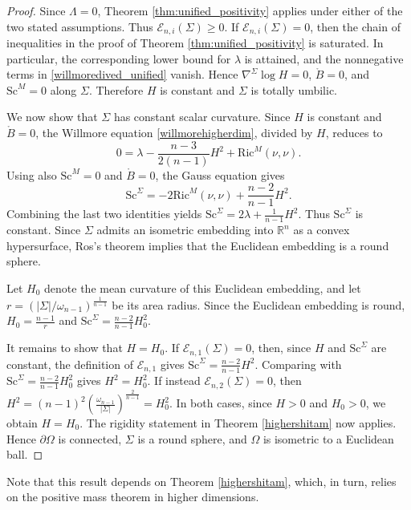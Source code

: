 \documentclass[12pt,a4paper]{amsart}
\theoremstyle{plain}
\theoremstyle{definition}
\begin{document}
\begin{proof}
Since $\Lambda=0$, Theorem \ref{thm:unified_positivity} applies under either of the two stated assumptions. Thus $\mathcal E_{n,i}(\Sigma)\ge 0$. If $\mathcal E_{n,i}(\Sigma)=0$, then the chain of inequalities in the proof of Theorem \ref{thm:unified_positivity} is saturated. In particular, the corresponding lower bound for $\lambda$ is attained, and the nonnegative terms in \eqref{willmoredived_unified} vanish. Hence $\nabla^\Sigma\log H=0$, $\mathring B=0$, and $\mathrm{Sc}^M=0$ along $\Sigma$. Therefore $H$ is constant and $\Sigma$ is totally umbilic.

We now show that $\Sigma$ has constant scalar curvature. Since $H$ is constant and $\mathring B=0$, the Willmore equation \eqref{willmorehigherdim}, divided by $H$, reduces to
\begin{equation}
0
=
\lambda
-
\frac{n-3}{2(n-1)}H^2
+
\mathrm{Ric}^M(\nu,\nu).
\end{equation}
Using also $\mathrm{Sc}^M=0$ and $\mathring B=0$, the Gauss equation gives
\begin{equation}
\mathrm{Sc}^{\Sigma}
=
-2\mathrm{Ric}^M(\nu,\nu)
+
\frac{n-2}{n-1}H^2.
\end{equation}
Combining the last two identities yields
$
\mathrm{Sc}^{\Sigma}
=
2\lambda
+
\frac{1}{n-1}H^2$. 
Thus $\mathrm{Sc}^{\Sigma}$ is constant. Since $\Sigma$ admits an isometric embedding into $\mathbb R^n$ as a convex hypersurface, Ros's theorem \cite{ros1988compact} implies that the Euclidean embedding is a round sphere.

Let $H_0$ denote the mean curvature of this Euclidean embedding, and let $r=\left(|\Sigma|/\omega_{n-1}\right)^{\frac{1}{n-1}}$ be its area radius. Since the Euclidean embedding is round, $H_0=\frac{n-1}{r}$ and
$\mathrm{Sc}^{\Sigma}=\frac{n-2}{n-1}H_0^2$.

It remains to show that $H=H_0$. If $\mathcal E_{n,1}(\Sigma)=0$, then, since $H$ and $\mathrm{Sc}^{\Sigma}$ are constant, the definition of $\mathcal E_{n,1}$ gives $
\mathrm{Sc}^{\Sigma}
=
\frac{n-2}{n-1}H^2$. 
Comparing with $\mathrm{Sc}^{\Sigma}=\frac{n-2}{n-1}H_0^2$  gives $H^2=H_0^2$.  If instead $\mathcal E_{n,2}(\Sigma)=0$, then
$
H^2
=
(n-1)^2
\left(
\frac{\omega_{n-1}}{|\Sigma|}
\right)^{\frac{2}{n-1}}
=
H_0^2$. In both cases, since $H>0$ and $H_0>0$, we obtain $H=H_0$. The rigidity statement in Theorem \ref{highershitam} now applies. Hence $\partial\Omega$ is connected, $\Sigma$ is a round sphere, and $\Omega$ is isometric to a Euclidean ball.
\end{proof}
Note that this result depends on Theorem \ref{highershitam}, which, in turn, relies on the positive mass theorem in higher dimensions.
\end{document}
